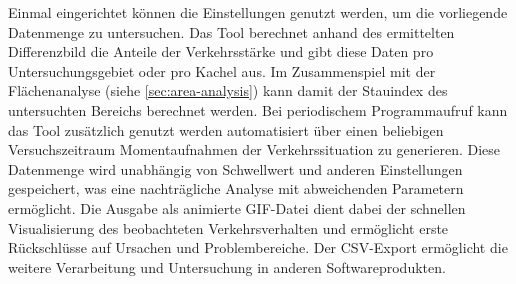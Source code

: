 Einmal eingerichtet können die Einstellungen genutzt werden, um die vorliegende Datenmenge zu untersuchen. Das Tool berechnet anhand des ermittelten Differenzbild die Anteile der Verkehrsstärke und gibt diese Daten pro Untersuchungsgebiet oder pro Kachel aus. Im Zusammenspiel mit der Flächenanalyse (siehe \ref{sec:area-analysis}) kann damit der Stauindex des untersuchten Bereichs berechnet werden. Bei periodischem Programmaufruf kann das Tool zusätzlich genutzt werden automatisiert über einen beliebigen Versuchszeitraum Momentaufnahmen der Verkehrssituation zu generieren. Diese Datenmenge wird unabhängig von Schwellwert und anderen Einstellungen gespeichert, was eine nachträgliche Analyse mit abweichenden Parametern ermöglicht. Die Ausgabe als animierte GIF-Datei dient dabei der schnellen Visualisierung des beobachteten Verkehrsverhalten und ermöglicht erste Rückschlüsse auf Ursachen und Problembereiche. Der CSV-Export ermöglicht die weitere Verarbeitung und Untersuchung in anderen Softwareprodukten.


